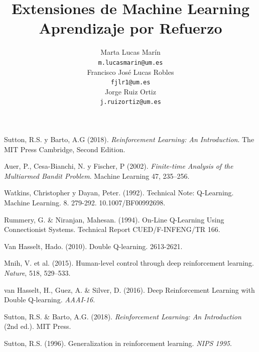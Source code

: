 \documentclass[a4paper, 10pt, twocolumn]{report}
\title{\textbf{\textcolor{UMUblue}{Extensiones de Machine Learning \\ Aprendizaje por Refuerzo}}}
\author{
Marta Lucas Marín 	\\
\texttt{m.lucasmarin@um.es} \\[0.4cm]
Francisco José Lucas Robles 	\\
\texttt{fjlr1@um.es} \\[0.4cm]
Jorge Ruiz Ortiz 	\\
\texttt{j.ruizortiz@um.es}}
\date{
\today
\vspace{3cm}%
\epigraph{\large{¡Nunca seré derrotado por una máquina! Jamás se inventará un programa que supere la inteligencia humana.}}{\large{G. Kasparov, 1989}\footnote{De una entrevista publicada en la edición nº 55 de la revista \textit{Jeux \& Stratégie.}}}
}
\begin{document}
\begin{titlepage}
\maketitle
\restoregeometry
\end{titlepage}



\tableofcontents





\begin{thebibliography}{9} %
	\setlength{\itemsep}{0pt} %
  	\setlength{\parsep}{0pt}    %
  	
    Sutton, R.S. y Barto, A.G (2018). \textit{Reinforcement Learning: An Introduction}. The MIT Press Cambridge, Second Edition.

    Auer, P., Cesa-Bianchi, N. y Fischer, P (2002). \textit{Finite-time Analysis of the Multiarmed Bandit Problem}. Machine Learning 47, 235–256.

    Watkins, Christopher y Dayan, Peter. (1992). Technical Note: Q-Learning. Machine Learning. 8. 279-292. 10.1007/BF00992698. 

    Rummery, G. & Niranjan, Mahesan. (1994). On-Line Q-Learning Using Connectionist Systems. Technical Report CUED/F-INFENG/TR 166. 

    Van Hasselt, Hado. (2010). Double Q-learning. 2613-2621.

    Mnih, V. et al. (2015). Human-level control through deep reinforcement learning. \textit{Nature}, 518, 529--533.

    van Hasselt, H., Guez, A. \& Silver, D. (2016). Deep Reinforcement Learning with Double Q-learning. \textit{AAAI-16}.

    Sutton, R.S. \& Barto, A.G. (2018). \textit{Reinforcement Learning: An Introduction} (2nd ed.). MIT Press.

    Sutton, R.S. (1996). Generalization in reinforcement learning. \textit{NIPS 1995}.


\end{thebibliography}
\end{document}

